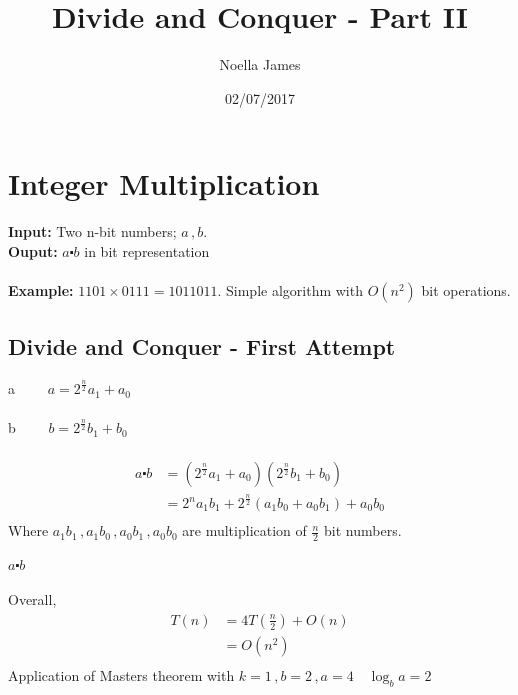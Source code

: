 \documentclass{article}
\theoremstyle{definition}
\theoremstyle{remark}
\theoremstyle{plain}
\begin{document}
\title{Divide and Conquer - Part II}
\date{02/07/2017}
\author{Noella James}
\maketitle

\section{Integer Multiplication}

\textbf{Input:} Two n-bit numbers; $a\,,b$.\\
\textbf{Ouput:} $a \centerdot b$ in bit representation\\\\
\textbf{Example:} $1101 \times 0111 = 1011011$.  Simple algorithm with $O(n^2)$ bit operations.


\subsection{Divide and Conquer - First Attempt}

a 
   $\qquad a = 2^{\frac{n}{2}} a_1 + a_0$
 \\\\
b
 $\qquad b = 2^{\frac{n}{2}} b_1 + b_0$
\\\\
\begin{equation*}
\begin{split}
a \centerdot b & = (2^{\frac{n}{2}} a_1 + a_0) (2^{\frac{n}{2}} b_1 + b_0)\\
& = 2^n a_1 b_1 + 2^{\frac{n}{2}} (a_1 b_0 + a_0 b_1) + a_0 b_0\\
\end{split}
\end{equation*}
Where $a_1 b_1\,, a_1 b_0\,, a_0 b_1\,, a_0 b_0$ are multiplication of $\frac{n}{2}$ bit numbers.\\\\
$a\centerdot b$  
\\\\
Overall,\\
\begin{equation*}
\begin{split}
T(n) &= 4 T(\frac{n}{2}) + O(n) \\
&= O(n^2)\\
\end{split}
\end{equation*}
Application of Masters theorem with $k=1\,,b=2\,,a=4\quad \log_b a = 2$\\
\end{document}
